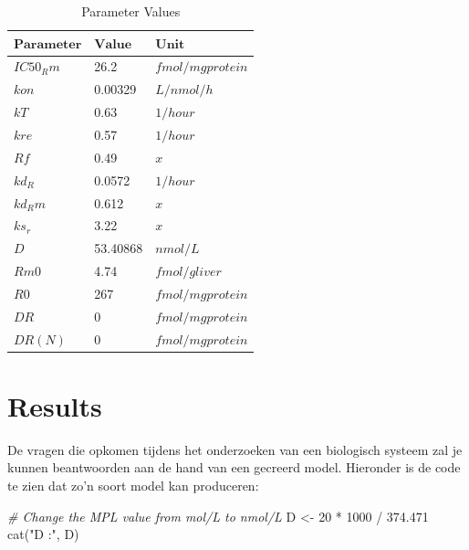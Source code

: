 \documentclass[
]{article}
\newenvironment{Shaded}{\begin{snugshade}}{\end{snugshade}}
\newcommand{\CommentTok}[1]{\textcolor[rgb]{0.56,0.35,0.01}{\textit{#1}}}
\newcommand{\DecValTok}[1]{\textcolor[rgb]{0.00,0.00,0.81}{#1}}
\newcommand{\FloatTok}[1]{\textcolor[rgb]{0.00,0.00,0.81}{#1}}
\newcommand{\FunctionTok}[1]{\textcolor[rgb]{0.00,0.00,0.00}{#1}}
\newcommand{\NormalTok}[1]{#1}
\newcommand{\OtherTok}[1]{\textcolor[rgb]{0.56,0.35,0.01}{#1}}
\newcommand{\SpecialCharTok}[1]{\textcolor[rgb]{0.00,0.00,0.00}{#1}}
\newcommand{\StringTok}[1]{\textcolor[rgb]{0.31,0.60,0.02}{#1}}
\begin{document}
\begin{longtable}[l]{l|l|l}
\caption{Parameter Values} \\ \hline
\label{param_table}
$\textbf{Parameter}$             &$\textbf{Value}$& $\textbf{Unit}$              \\ \hline
\endhead
$IC50_Rm$       & 26.2  & $fmol/mg protein$         \\ \hline
$kon$       & 0.00329  & $L/nmol/h$         \\ \hline
$kT$       & 0.63  & $1 / hour$         \\ \hline
$kre$       & 0.57  & $1 / hour$         \\ \hline
$Rf$       & 0.49  & $x$         \\ \hline
$kd_R$       & 0.0572  & $1 / hour$         \\ \hline
$kd_Rm$       & 0.612  & $x$         \\ \hline
$ks_r$       & 3.22  & $x$         \\ \hline
$D$       & 53.40868  & $nmol/L$         \\ \hline
$Rm0$       & 4.74  & $fmol/g liver$         \\ \hline
$R0$       & 267  & $fmol/mg protein$         \\ \hline
$DR$       & 0  & $fmol/mg protein$         \\ \hline
$DR(N)$       & 0  & $fmol/mg protein$         \\ \hline
\end{longtable}

\hypertarget{results}{%
\section{Results}\label{results}}

De vragen die opkomen tijdens het onderzoeken van een biologisch systeem
zal je kunnen beantwoorden aan de hand van een gecreerd model. Hieronder
is de code te zien dat zo'n soort model kan produceren:

\begin{Shaded}
\begin{Highlighting}[]
\CommentTok{\# Change the MPL value from mol/L to nmol/L}
\NormalTok{D }\OtherTok{\textless{}{-}} \DecValTok{20} \SpecialCharTok{*} \DecValTok{1000} \SpecialCharTok{/} \FloatTok{374.471}
\FunctionTok{cat}\NormalTok{(}\StringTok{"D :"}\NormalTok{, D)}
\end{Highlighting}
\end{Shaded}
\end{document}
